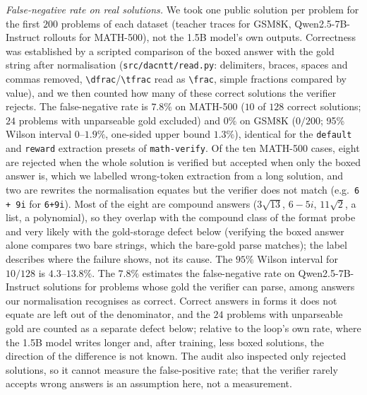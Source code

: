 \documentclass[runningheads]{llncs}
\begin{document}
\emph{False-negative rate on real solutions.} We took one public solution per
problem for the first $200$ problems of each dataset (teacher traces for GSM8K,
Qwen2.5-7B-Instruct rollouts for MATH-500), not the 1.5B model's own outputs.
Correctness was established by a scripted comparison of the boxed answer with
the gold string after normalisation (\texttt{src/dacntt/read.py}: delimiters,
braces, spaces and commas removed, \verb|\dfrac|/\verb|\tfrac| read as
\verb|\frac|, simple fractions compared by value), and we then counted how many of
these correct solutions the verifier rejects. The false-negative rate is
$7.8\%$ on MATH-500 ($10$ of $128$ correct solutions; $24$ problems with
unparseable gold excluded) and $0\%$ on GSM8K ($0/200$; 95\% Wilson interval
$0$--$1.9\%$, one-sided upper bound $1.3\%$), identical for the \texttt{default}
and \texttt{reward} extraction presets of \texttt{math-verify}. Of the ten
MATH-500 cases, eight are rejected when the whole solution is verified but
accepted when only the boxed answer is, which we labelled wrong-token
extraction from a long solution, and two are rewrites the normalisation
equates but the verifier does not match (e.g.\ \verb|6 + 9i| for \verb|6+9i|).
Most of the eight are compound answers ($3\sqrt{13}$, $6-5i$, $11\sqrt2$, a
list, a polynomial), so they overlap with the compound class of the format
probe and very likely with the gold-storage defect below (verifying the boxed
answer alone compares two bare strings, which the bare-gold parse matches);
the label describes where the failure shows, not its cause. The $95\%$ Wilson
interval for $10/128$ is $4.3$--$13.8\%$.
The $7.8\%$ estimates the false-negative rate on Qwen2.5-7B-Instruct solutions
for problems whose gold the verifier can parse, among answers our normalisation
recognises as correct. Correct answers in forms it does not equate are left out
of the denominator, and the $24$ problems with unparseable gold are counted as a
separate defect below; relative to the loop's own rate, where the 1.5B model
writes longer and, after training, less boxed solutions, the direction of the
difference is not known. The audit also inspected only rejected solutions, so it cannot measure
the false-positive rate; that the verifier rarely accepts wrong answers is an
assumption here, not a measurement.
\end{document}
